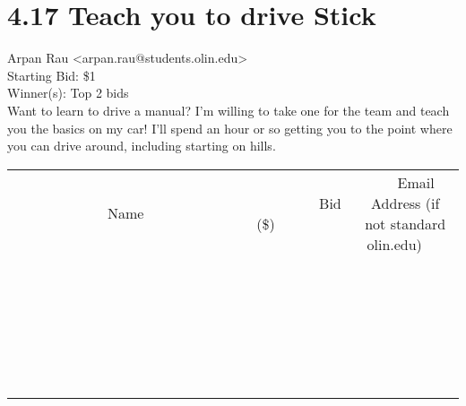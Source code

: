 \documentclass[11pt]{article}
\begin{document}
					\section*{4.17 Teach you to drive Stick}
					Arpan Rau <arpan.rau@students.olin.edu> \\
					Starting Bid: \$1 \\
					Winner(s): Top 2 bids \\
					Want to learn to drive a manual? I'm willing to take one for the team and teach you the basics on my car! I'll spend an hour or so getting you to the point where you can drive around, including starting on hills. \\
					[6ex]
					\begin{tabular}{c c c}
						~~~~~~~~~~~~~Name~~~~~~~~~~~~~ & ~~~~~~~~~Bid (\$)~~~~~~~~~ & ~~~Email Address (if not standard olin.edu)~~~ \\
				
 & & \\
\hline
 & & \\
\hline
 & & \\
\hline
 & & \\
\hline
 & & \\
\hline
 & & \\
\hline
 & & \\
\hline
 & & \\
\hline
 & & \\
\hline
 & & \\
\hline
 & & \\
\hline
 & & \\
\hline
 & & \\
\hline
 & & \\
\hline
 & & \\
\hline
 & & \\
\hline
 & & \\
\hline
 & & \\
\hline
 & & \\
\hline
 & & \\
\hline
 & & \\
\hline
 & & \\
\hline
 & & \\
\hline
 & & \\
\hline
 & & \\
\hline
 & & \\
\hline
					\end{tabular}
					\clearpage
				
\end{document}
